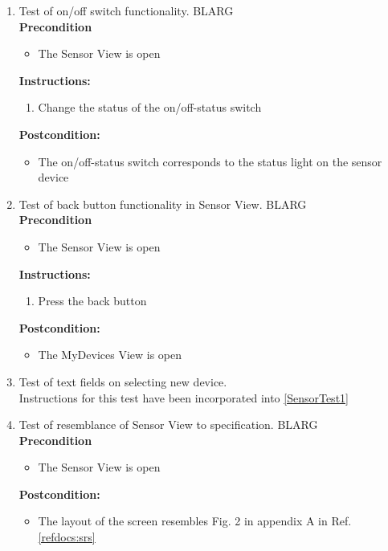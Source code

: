 \documentclass[a4paper]{article}
\newlength{\testlabellength}
\newenvironment{testlist}{\begin{enumerate}[label=\bfseries Instruction \thesubsection.\arabic* , labelindent=0pt, labelwidth=\testlabellength , leftmargin=2cm]}{\end{enumerate}}
\newenvironment{precondition}{
{\color{white}BLARG}\\ 
\textbf{Precondition}
\begin{itemize}[labelindent=0cm, labelwidth=2cm , leftmargin=1cm]
}
{\end{itemize}}
\newenvironment{instruction}{
\textbf{Instructions:}
\begin{enumerate}[label=\bfseries  \arabic*., labelindent=0cm, labelwidth=2cm , leftmargin=1cm]
}
{\end{enumerate}}
\newenvironment{postcondition}{
\textbf{Postcondition:}
\begin{itemize}[labelindent=0cm, labelwidth=2cm , leftmargin=1cm]
}
{\end{itemize}}
\begin{document}
\begin{appendices}
\begin{testlist}
	\item Test of on/off switch functionality.
		\begin{precondition}
			\item The Sensor View is open
		\end{precondition}
		\begin{instruction}
			\item Change the status of the on/off-status switch
		\end{instruction}
		\begin{postcondition}
			\item The on/off-status switch corresponds to the status light on the sensor device
		\end{postcondition}

	\item Test of back button functionality in Sensor View.
		\begin{precondition}
			\item The Sensor View is open
		\end{precondition}
		\begin{instruction}
			\item Press the back button
		\end{instruction}
		\begin{postcondition}
			\item The MyDevices View is open
		\end{postcondition}

	\item Test of text fields on selecting new device. \\
		Instructions for this test have been incorporated into \ref{SensorTest1}

	\item Test of resemblance of Sensor View to specification.
		\begin{precondition}
			\item The Sensor View is open
		\end{precondition}
		\begin{postcondition}
			\item The layout of the screen resembles Fig. 2 in appendix A in Ref. \ref{refdocs:srs}
		\end{postcondition}
\end{testlist}


\end{appendices}
\end{document}
